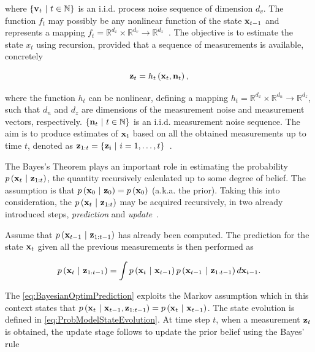 \noindent where $\left\{ {\mathbf{v}_t \ | \ t \in \mathbb{N}} \right\}$ is an i.i.d. process noise sequence of dimension $d_v$. The function $f_t$ may possibly be any nonlinear function of the state $\mathbf{x}_{t - 1}$ and represents a mapping $f_t = \mathbb{R}^{d_x} \times \mathbb{R}^{d_v} \to \mathbb{R}^{d_x}$~\cite{Arulampalam2007}. The objective is to estimate the state $x_t$ using recursion, provided that a sequence of measurements is available, concretely

\begin{equation}
    \mathbf{z}_t = {h_t} \left( \mathbf{x}_t, \mathbf{n}_t \right),
\end{equation}

\noindent where the function $h_t$ can be nonlinear, defining a mapping $h_t = \mathbb{R}^{d_x} \times \mathbb{R}^{d_n} \to \mathbb{R}^{d_z}$, such that $d_n$ and $d_z$ are dimensions of the measurement noise and measurement vectors, respectively. $\left\{ {\mathbf{n}_t \ | \ t \in \mathbb{N}} \right\}$ is an i.i.d. measurement noise sequence. The aim is to produce estimates of $\mathbf{x}_t$ based on all the obtained measurements up to time $t$, denoted as $\mathbf{z}_{1:t} = \left\{ {\mathbf{z_i} \ | \ i = 1, \dots, t} \right\}$~\cite{Arulampalam2007}.

The Bayes's Theorem plays an important role in estimating the probability $p \left( \mathbf{x}_t \ | \ \mathbf{z}_{1:t} \right)$, the quantity recursively calculated up to some degree of belief. The assumption is that $p \left( \mathbf{x}_0 \ | \ \mathbf{z}_0 \right) = p \left( \mathbf{x}_0 \right)$ (a.k.a. the prior). Taking this into consideration, the $p \left( \mathbf{x}_t \ | \ \mathbf{z}_{1:t} \right)$ may be acquired recursively, in two already introduced steps, \emph{prediction} and \emph{update}~\cite{Arulampalam2007}.

Assume that $p \left( \mathbf{x}_{t - 1} \ | \ \mathbf{z}_{1:t - 1} \right)$ has already been computed. The prediction for the state $\mathbf{x}_t$ given all the previous measurements is then performed as

\begin{equation}
    \label{eq:BayesianOptimPrediction}
    p \left( \mathbf{x}_t \ | \ \mathbf{z}_{1:t - 1} \right) = \int p \left( \mathbf{x}_t \ | \ \mathbf{x}_{t - 1} \right) p \left( \mathbf{x}_{t - 1} \ | \ \mathbf{z}_{1:t - 1} \right) d\mathbf{x}_{t - 1}.
\end{equation}

\noindent The \cref{eq:BayesianOptimPrediction} exploits the Markov assumption which in this context states that $p \left( \mathbf{x}_t \ | \ \mathbf{x}_{t - 1}, \mathbf{z}_{1:t - 1} \right) = p \left( \mathbf{x}_t \ | \ \mathbf{x}_{t - 1} \right)$. The state evolution is defined in \cref{eq:ProbModelStateEvolution}. At time step $t$, when a measurement $\mathbf{z}_t$ is obtained, the update stage follows to update the prior belief using the Bayes' rule

